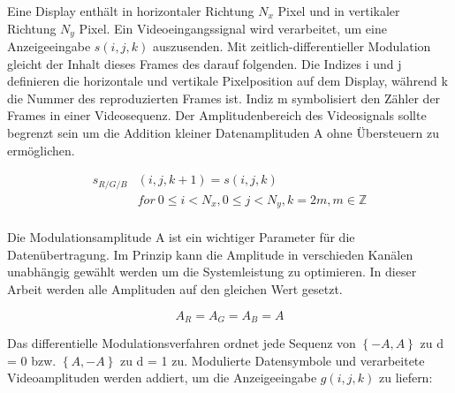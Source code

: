 Eine Display enthält in horizontaler Richtung $N_x$ Pixel und in vertikaler Richtung $N_y$ Pixel. Ein Videoeingangssignal wird verarbeitet, um eine Anzeigeeingabe $s(i,j,k)$ auszusenden. Mit zeitlich-differentieller Modulation gleicht der Inhalt dieses Frames des darauf folgenden. Die Indizes i und j definieren die horizontale und vertikale Pixelposition auf dem Display, während k die Nummer des reproduzierten Frames ist. Indiz m symbolisiert den Zähler der Frames in einer Videosequenz. Der Amplitudenbereich des Videosignals sollte begrenzt sein um die Addition kleiner Datenamplituden A ohne Übersteuern zu ermöglichen.

\begin{equation}
\begin{split}
 s_{R/G/B}&(i,j,k+1) = s(i,j,k) \\
          &  for \ 0\le i <N_x, 0\le j<N_y,k=2m , m \in \mathbb{Z}\\
\end{split}
\end{equation}



Die Modulationsamplitude A ist ein wichtiger Parameter für die Datenübertragung. Im Prinzip kann die Amplitude in verschieden Kanälen unabhängig gewählt werden um die Systemleistung zu optimieren. In dieser Arbeit werden alle Amplituden auf den gleichen Wert gesetzt.

\begin{equation}
 A_R=A_G=A_B=A        
\end{equation}

Das differentielle Modulationsverfahren ordnet jede Sequenz von $\left\{-A, A\right\}$ zu d = 0 bzw. $\left\{A, -A\right\}$ zu d = 1 zu. Modulierte Datensymbole und verarbeitete Videoamplituden werden addiert, um die Anzeigeeingabe $g(i,j,k)$ zu liefern:


